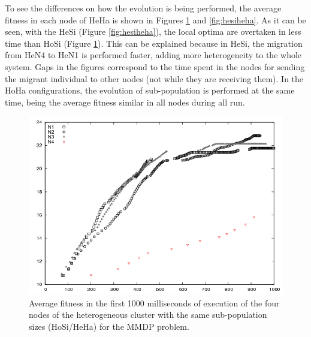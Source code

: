 To see the differences on how the evolution is being performed, the average fitness in each node of HeHa is shown in Figures \ref{fig:hosiheha} and \ref{fig:hesiheha}. As it can be seen, with the HeSi (Figure \ref{fig:hesiheha}), the local optima are overtaken in less time than HoSi (Figure \ref{fig:hosiheha}).  This can be explained because in HeSi, the migration from HeN4 to HeN1 is performed faster, adding more heterogeneity to the whole system. Gaps in the figures correspond to the time spent in the nodes for sending the migrant individual to other nodes (not while they are receiving them). In the HoHa configurations, the evolution of sub-population is performed at the same time, being the average fitness similar in all nodes during all run. 


\begin{figure}
\centering
 \includegraphics[scale =0.4] {gfx/adaptiveresults/generationsMMDPhomosize.png}
\caption{Average fitness in the first 1000 milliseconds of execution of the four nodes of the heterogeneous cluster with the same sub-population sizes (HoSi/HeHa) for the MMDP problem.}
\label{fig:hosiheha}
\end{figure}

